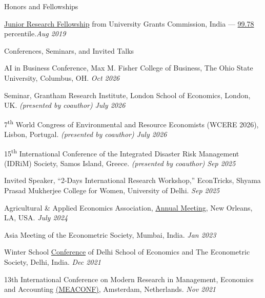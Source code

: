 \documentclass{resume} %
\begin{document}
\begin{rSection}{Honors and Fellowships}{}{}
\vspace{-1em}
\item\href{https://drive.google.com/file/d/1GstIM0OlO_bdDtV43VpioO9cEnPpfDZ6/view?usp=sharing}{Junior Research Fellowship} from University Grants Commission, India --- \href{https://drive.google.com/file/d/1GoxmjvLKzlBHU06iRJFYcUM30aNGaGOM/view?usp=sharing}{99.78} percentile.\hfill \textit{Aug 2019}
\end{rSection}


\begin{rSection}{Conferences, Seminars, and Invited Talks}{}{}
\vspace{-1em}

\item AI in Business Conference, Max M. Fisher College of Business, The Ohio State University, Columbus, OH. \hfill \textit{Oct 2026}

\item
Seminar, Grantham Research Institute, London School of Economics,
London, UK. \textit{(presented by coauthor)} \hfill \textit{July 2026}

\item 7\textsuperscript{th} World Congress of Environmental and Resource Economists (WCERE 2026), Lisbon, Portugal. \textit{(presented by coauthor)} \hfill \textit{July 2026}

\item15\textsuperscript{th} International Conference of the Integrated Disaster Risk Management (IDRiM) Society, Samos Island, Greece. \textit{(presented by coauthor)} \hfill \textit{Sep 2025}

\item Invited Speaker, ``2-Days International Research Workshop,'' EconTricks, Shyama Prasad Mukherjee College for Women, University of Delhi. \hfill \textit{Sep 2025} 

\item Agricultural \& Applied Economics Association, \href{https://drive.google.com/file/d/1jGD9MliRIPcL3OPYEfOlipd1TuVYpHfs/view?usp=sharing}{Annual Meeting}, New Orleans, LA, USA. \hfill \textit{July 2024}

\item Asia Meeting of the Econometric Society, Mumbai, India.
\hfill \textit{Jan 2023}

\item Winter School \href{https://drive.google.com/file/d/1AUwis0NOU-3JEBN-1tlTl56ehKWF64Xu/view?usp=sharing}{Conference} of Delhi School of Economics and The Econometric Society, Delhi, India. \hfill \textit {Dec 2021}

\item13th International Conference on Modern Research
in Management, Economics and Accounting \href{https://drive.google.com/file/d/1ksOV7DJxA2Em14ers2X-_QmYleGxwBlw/view}{(MEACONF)}, Amsterdam, Netherlands. \hspace{96mm} \textit{Nov 2021}
\end{rSection}
\end{document}
